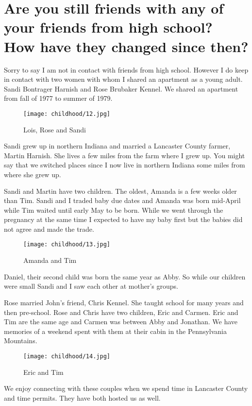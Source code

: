 \section{Are you still friends with any of your friends from high school? How have they changed since then?}
Sorry to say I am not in contact with friends from high school.
However I do keep in contact with two women with whom I shared an apartment as a young adult.
Sandi Bontrager Harnish and Rose Brubaker Kennel.
We shared an apartment from fall of 1977 to summer of 1979.
\begin{figure}
\centering
\texttt{[image: childhood/12.jpg]}
\caption{
Lois, Rose and Sandi
}
\end{figure}

Sandi grew up in northern Indiana and married a Lancaster County farmer, Martin Harnish.
She lives a few miles from the farm where I grew up.
You might say that we switched places since I now live in northern Indiana some miles from where she grew up.

Sandi and Martin have two children.
The oldest, Amanda is a few weeks older than Tim.
Sandi and I traded baby due dates and Amanda was born mid-April while Tim waited until early May to be born.
While we went through the pregnancy at the same time I expected to have my baby first but the babies did not agree and made the trade.
\begin{figure}
\centering
\texttt{[image: childhood/13.jpg]}
\caption{
Amanda and Tim
}
\end{figure}
Daniel, their second child was born the same year as Abby.
So while our children were small Sandi and I saw each other at mother's groups.

Rose married John's friend, Chris Kennel.
She taught school for many years and then pre-school.
Rose and Chris have two children, Eric and Carmen.
Eric and Tim are the same age and Carmen was between Abby and Jonathan.
We have memories of a weekend spent with them at their cabin in the Pennsylvania Mountains.
\begin{figure}
\centering
\texttt{[image: childhood/14.jpg]}
\caption{
Eric and Tim
}
\end{figure}
We enjoy connecting with these couples when we spend time in Lancaster County and time permits.
They have both hosted us as well.







